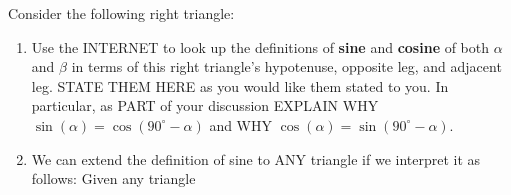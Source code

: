 \documentclass[noauthor,nooutcomes,hints,handout]{ximera}
\begin{document}
\begin{question}
  Consider the following right triangle:
  \begin{center}
    \end{center}
  \begin{enumerate}
  \item Use the INTERNET to look up the definitions of \textbf{sine}
    and \textbf{cosine} of both $\alpha$ and $\beta$ in terms of this
    right triangle's hypotenuse, opposite leg, and adjacent leg. STATE
    THEM HERE as you would like them stated to you.  In particular, as
    PART of your discussion EXPLAIN WHY $\sin(\alpha) =
    \cos(90^\circ-\alpha)$ and WHY $\cos(\alpha) =
    \sin(90^\circ-\alpha)$.
    \item We can extend the definition of sine to ANY triangle if we
      interpret it as follows: Given any triangle
      \begin{center}
\end{center}
\end{enumerate}
\end{question}
\end{document}
